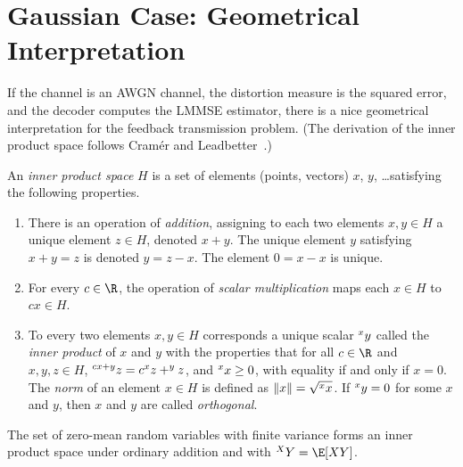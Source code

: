 \section{Gaussian Case: Geometrical Interpretation}

If the channel is an AWGN channel, the distortion measure is the squared error,
and the decoder computes the LMMSE estimator, there is a nice geometrical
interpretation for the feedback transmission problem. (The derivation of the
inner product space follows Cramér and
Leadbetter~\cite[Section~5.6]{CramerL1967}.)

\begin{definition}
  An \emph{inner product space} $H$ is a set of elements (points, vectors) $x$,
  $y$, \dots satisfying the following properties.
  \begin{enumerate}
    \item There is an operation of \emph{addition}, assigning to each two
      elements $x, y \in H$ a unique element $z \in H$, denoted $x + y$.
      The unique element $y$ satisfying $x + y = z$ is denoted $y = z - x$. The
      element $0 = x-x$ is unique. 
    \item For every $c \in \R$, the operation of \emph{scalar multiplication}
      maps each $x \in H$ to $cx \in H$. 
    \item To every two elements $x,y \in H$ corresponds a unique scalar $\sp x
      y$ called the \emph{inner product} of $x$ and $y$ with the properties that
      for all $c \in \R$ and $x,y, z\in H$, $\sp{cx+y}{z} = c\sp xz + \sp yz$,
      and $\sp xx \ge 0$, with equality if and only if $x = 0$. The
      \emph{norm} of an element $x \in H$ is defined as $\|x\| = \sqrt{\sp xx}$.
      If $\sp xy = 0$ for some $x$ and $y$, then $x$ and $y$ are called
      \emph{orthogonal}.
  \end{enumerate}
\end{definition}

\begin{lemma}
  \label{lem:rvinprodsp}
  The set of zero-mean random variables with finite variance forms an inner
  product space under ordinary addition and with $\sp XY = \E[X Y]$. 
\end{lemma}

